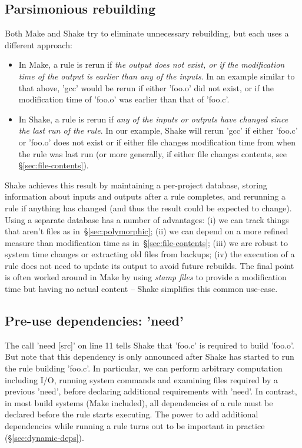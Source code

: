 \subsection{Parsimonious rebuilding}

Both Make and Shake try to eliminate unnecessary rebuilding, but each
uses a different approach:

\begin{itemize}
\item In Make, a rule is rerun if \emph{the output does not exist, or if the
modification time of the output is earlier than any of the inputs}. In an example
similar to that above, \lst'gcc' would be rerun if either \lst'foo.o' did not
exist, or if the modification time of \lst'foo.o' was earlier than that of
\lst'foo.c'.
\item In Shake, a rule is rerun if \emph{any of the inputs or outputs have changed since the
last run of the rule}. In our example, Shake will rerun \lst'gcc' if
either \lst'foo.c' or \lst'foo.o' does not exist or if either file
changes modification time from when the rule was last run (or more
generally, if either file changes contents, see
\S\ref{sec:file-contents}).
\end{itemize}
\noindent
Shake achieves this result by maintaining a per-project database, storing information about inputs and outputs after a rule completes, and rerunning a rule if anything has
changed (and thus the result could be expected to change). Using a separate database
has a number of advantages: (i) we can track things that aren't files as
in~\S\ref{sec:polymorphic}; (ii) we can depend on a more refined measure than
modification time as in~\S\ref{sec:file-contents}; (iii) we are robust to system
time changes or extracting old files from backups; (iv) the execution of a rule
does not need to update its output to avoid future rebuilds. The final point is
often worked around in Make by using \emph{stamp files} to provide a
modification time but having no actual content -- Shake simplifies this common
use-case.

\subsection{Pre-use dependencies: \lst'need'\label{sec:need}}

The call \lst'need [src]' on line 11 tells Shake that \lst'foo.c' is required
to build \lst'foo.o'. But note that this dependency is only announced
after Shake has started to run the rule building \lst'foo.c'.
In particular, we can perform
arbitrary computation including I/O, running system commands and examining files
required by a previous \lst'need', before declaring additional requirements with \lst'need'.
In contrast, in most build systems (Make included), all dependencies of a rule must be
declared before the rule starts executing. The power to add additional dependencies
while running a rule turns out to be important in practice (\S\ref{sec:dynamic-deps}).

